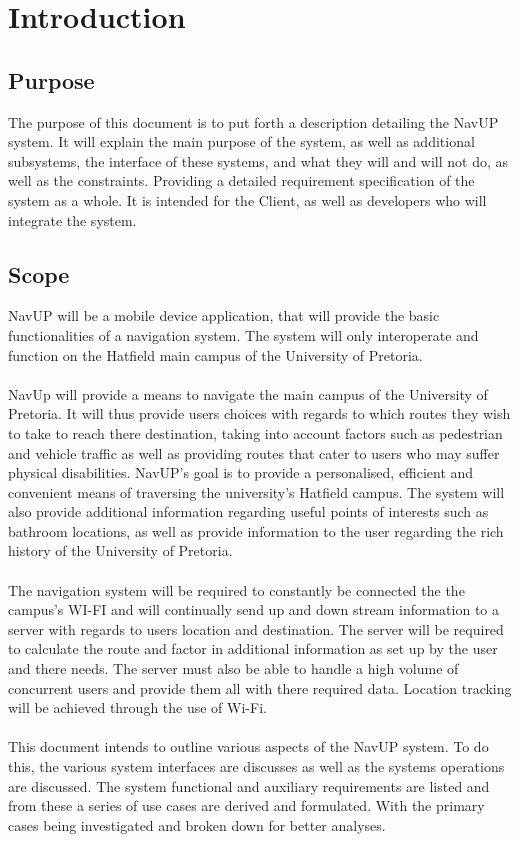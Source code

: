 \documentclass{article}
\begin{document}
	\newpage
	
	\section{Introduction}
    	
        \subsection{Purpose}
        	{The purpose of this document is to put forth a description detailing the NavUP system. It will explain the main purpose of the system, as well as additional subsystems, the interface of these systems, and what they will and will not do, as well as the constraints. Providing a detailed requirement specification of the system as a whole. It is intended for the Client, as well as developers who will integrate the system.}
    	\subsection{Scope}
{NavUP will be a mobile device application, that will provide the basic functionalities of a navigation system. The system will only interoperate and function on the Hatfield main campus of the University of Pretoria.\\\\NavUp will provide a means to navigate the main campus of the University of Pretoria. It will thus provide users choices with regards to which routes they wish to take to reach there destination, taking into account factors such as pedestrian and vehicle traffic as well as providing routes that cater to users who may suffer physical disabilities. NavUP's goal is to provide a personalised, efficient and convenient means of traversing the university's Hatfield campus. The system will also provide additional information regarding useful points of interests such as bathroom locations, as well as provide information to the user regarding the rich history of the University of Pretoria.\\\\The navigation system will be required to constantly be connected the the campus's WI-FI and will continually send up and down stream information to a server with regards to users location and destination. The server will be required to calculate the route and factor in additional information as set up by the user and there needs. The server must also be able to handle a high volume of concurrent users and provide them all with there required data. Location tracking will be achieved through the use of Wi-Fi.\\\\This document intends to outline various aspects of the NavUP system. To do this, the various system interfaces are discusses as well as the systems operations are discussed. The system functional and auxiliary requirements are listed and from these a series of use cases are derived and formulated. With the primary cases being investigated and broken down for better analyses. }
\end{document}
